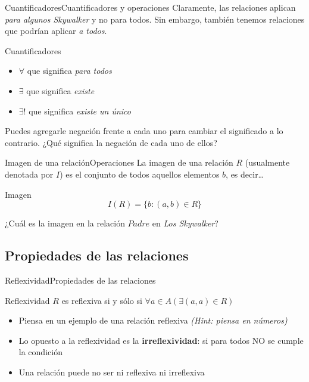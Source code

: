 \documentclass[spanish, c]{beamer}
\begin{document}
\begin{frame}{Cuantificadores}{Cuantificadores y operaciones}
    Claramente, las relaciones aplican \textit{para algunos Skywalker} y no para todos. \pause
    Sin embargo, también tenemos relaciones que podrían aplicar \textit{a todos}. \pause

    \begin{block}{Cuantificadores}
        \begin{itemize}
            \item $\forall$ que significa \textit{para todos}
            \item $\exists$ que significa \textit{existe}
            \item $\exists!$ que significa \textit{existe un único}
        \end{itemize}
    \end{block} \pause

    \bigskip

    Puedes agregarle negación frente a cada uno para cambiar el significado a lo contrario.
    ¿Qué significa la negación de cada uno de ellos?
\end{frame}

\begin{frame}{Imagen de una relación}{Operaciones}
    La \alert{imagen} de una relación $R$ (usualmente denotada por $I$) es el conjunto de todos aquellos elementos $b$, es decir\dots \pause

    \bigskip

    \begin{block}{Imagen}
        $$I(R) = \{b : (a, b) \in R\}$$
    \end{block} \pause

    \bigskip

    ¿Cuál es la imagen en la relación $Padre$ en \textit{Los Skywalker}?
\end{frame}

\subsection{Propiedades de las relaciones}

\begin{frame}{Reflexividad}{Propiedades de las relaciones}
    
    \begin{block}{Reflexividad}
        $R$ es \alert{reflexiva} si y sólo si $\forall a \in A \left( \exists (a, a) \in R \right)$
    \end{block} \pause

    \bigskip

    \begin{itemize}
        \item Piensa en un ejemplo de una relación reflexiva \textit{(Hint: piensa en números)}
        \item Lo opuesto a la reflexividad es la \textbf{irreflexividad}: si para todos NO se cumple la condición
        \item Una relación puede no ser ni reflexiva ni irreflexiva
    \end{itemize}

\end{frame}
\end{document}
